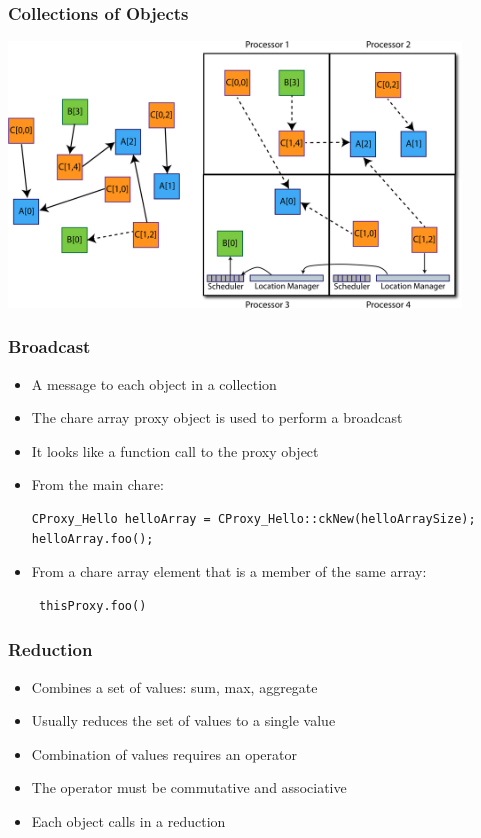 \begin{frame}[fragile]
  \frametitle{Collections of Objects}
  \begin{center}\includegraphics[width=0.9\textwidth]{figures/elements2.pdf}\end{center}
\end{frame}

\begin{frame}[fragile]
  \frametitle{Broadcast}
  \begin{itemize}
    \item A message to each object in a collection
    \item The chare array proxy object is used to perform a broadcast
    \item It looks like a function call to the proxy object
    \item From the main chare:
    \begin{lstlisting}
CProxy_Hello helloArray = CProxy_Hello::ckNew(helloArraySize);
helloArray.foo();
    \end{lstlisting}
    \item From a chare array element that is a member of the same array:
     \begin{lstlisting}
 thisProxy.foo()
    \end{lstlisting}
  \end{itemize}
\end{frame}

\begin{frame}[fragile]
  \frametitle{Reduction}
  \begin{itemize}
  \item Combines a set of values: sum, max, aggregate
  \item Usually reduces the set of values to a single value
  \item Combination of values requires an operator
  \item The operator must be commutative and associative
  \item Each object calls  in a reduction
  \end{itemize}
\end{frame}

